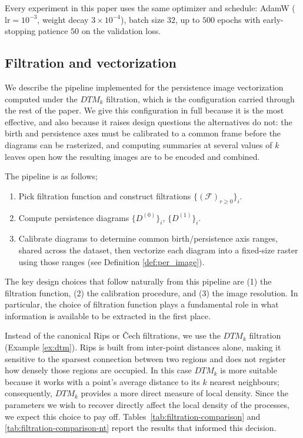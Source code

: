 \documentclass[11pt,letterpaper]{article}
\newcommand{\1}{\mathds{1}}
\newcommand{\filt}{\mathcal{F}}
\theoremstyle{plain}
\theoremstyle{definitioncolon}
\begin{document}
Every experiment in this paper uses the same optimizer and schedule: AdamW ($\text{lr}=10^{-3}$,
weight decay $3\times10^{-4}$), batch size $32$, up to $500$ epochs with
early-stopping patience $50$ on the validation loss.

\subsection{Filtration and vectorization}

We describe the pipeline implemented for the
persistence image vectorization computed under the $DTM_k$ filtration, which is the
configuration carried through the rest of the paper. We give this configuration
in full because it is the most effective, and also because it raises design questions the alternatives do
not: the birth and persistence axes must be calibrated to a common frame before
the diagrams can be rasterized, and computing summaries at several values of $k$
leaves open how the resulting images are to be encoded and combined.

The pipeline is as follows;
    \begin{enumerate}
        \item Pick filtration function and construct filtrations
        $\{(\filt)_{r\geq 0}\}_i$.
        \item Compute persistence diagrams $\{D^{(0)}\}_i$, $\{D^{(1)}\}_i$.
        \item Calibrate diagrams to determine common birth/persistence axis
        ranges, shared across the dataset, then vectorize each diagram into a
        fixed-size raster using those ranges (see Definition
        \ref{def:per_image}).
    \end{enumerate}
The key design choices that follow naturally from this pipeline are (1) the filtration function,
(2) the calibration procedure, and (3) the image resolution. In particular, the choice of filtration function plays a fundamental role in
what information is available to be extracted in the first place. 

Instead of the canonical Rips or Čech filtrations, we use the $DTM_k$ filtration (Example \ref{ex:dtm}).
Rips is built from inter-point distances alone, making it sensitive to the
sparsest connection between two regions and does not register how densely those
regions are occupied. In this case $DTM_k$ is more suitable because it works with a point's average distance to its
$k$ nearest neighbours; consequently, $DTM_k$ provides a more direct measure of local density.
Since the parameters we wish to recover directly affect the local density of the processes,
we expect this choice to pay off. Tables~\ref{tab:filtration-comparison} and
\ref{tab:filtration-comparison-nt} report the results that informed this decision.
\end{document}
